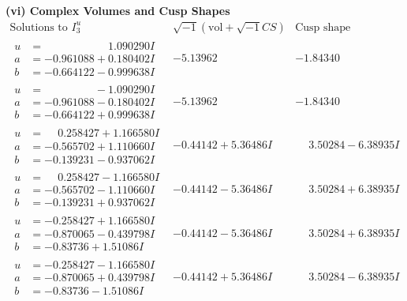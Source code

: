 \documentclass[1p]{elsarticle_modified}
\theoremstyle{definition}
\newcommand{\I}{\sqrt{-1}}
\begin{document}
\newpage\flushleft \textbf{(vi) Complex Volumes and Cusp Shapes}
$$\begin{array}{c|c|c}  
\text{Solutions to }I^u_{3}& \I (\text{vol} + \sqrt{-1}CS) & \text{Cusp shape}\\
 \hline 
\begin{aligned}
u &= \phantom{-0.000000 -}1.090290 I \\
a &= -0.961088 + 0.180402 I \\
b &= -0.664122 - 0.999638 I\end{aligned}
 & -5.13962\phantom{ +0.000000I} & -1.84340\phantom{ +0.000000I} \\ \hline\begin{aligned}
u &= \phantom{-0.000000 } -1.090290 I \\
a &= -0.961088 - 0.180402 I \\
b &= -0.664122 + 0.999638 I\end{aligned}
 & -5.13962\phantom{ +0.000000I} & -1.84340\phantom{ +0.000000I} \\ \hline\begin{aligned}
u &= \phantom{-}0.258427 + 1.166580 I \\
a &= -0.565702 + 1.110660 I \\
b &= -0.139231 - 0.937062 I\end{aligned}
 & -0.44142 + 5.36486 I & \phantom{-}3.50284 - 6.38935 I \\ \hline\begin{aligned}
u &= \phantom{-}0.258427 - 1.166580 I \\
a &= -0.565702 - 1.110660 I \\
b &= -0.139231 + 0.937062 I\end{aligned}
 & -0.44142 - 5.36486 I & \phantom{-}3.50284 + 6.38935 I \\ \hline\begin{aligned}
u &= -0.258427 + 1.166580 I \\
a &= -0.870065 - 0.439798 I \\
b &= -0.83736 + 1.51086 I\end{aligned}
 & -0.44142 - 5.36486 I & \phantom{-}3.50284 + 6.38935 I \\ \hline\begin{aligned}
u &= -0.258427 - 1.166580 I \\
a &= -0.870065 + 0.439798 I \\
b &= -0.83736 - 1.51086 I\end{aligned}
 & -0.44142 + 5.36486 I & \phantom{-}3.50284 - 6.38935 I \\ \hline\begin{aligned}

\end{aligned}
\end{array}$$
\end{document}
